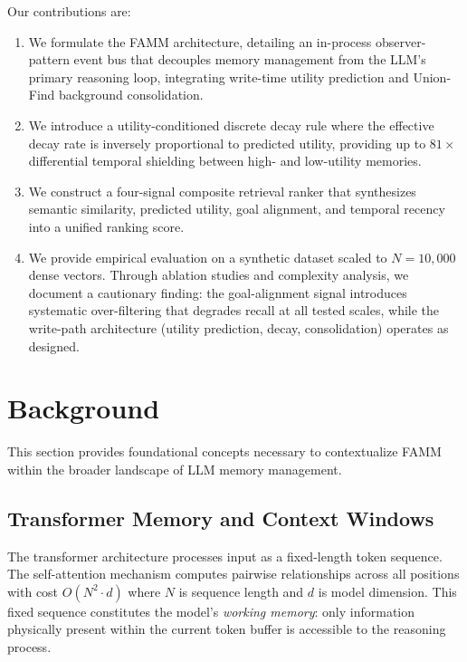\documentclass[conference]{IEEEtran}
\begin{document}
Our contributions are:
\begin{enumerate}
    \item We formulate the FAMM architecture, detailing an in-process observer-pattern event bus that decouples memory management from the LLM's primary reasoning loop, integrating write-time utility prediction and Union-Find background consolidation.
    \item We introduce a utility-conditioned discrete decay rule where the effective decay rate is inversely proportional to predicted utility, providing up to $81\times$ differential temporal shielding between high- and low-utility memories.
    \item We construct a four-signal composite retrieval ranker that synthesizes semantic similarity, predicted utility, goal alignment, and temporal recency into a unified ranking score.
    \item We provide empirical evaluation on a synthetic dataset scaled to $N{=}10{,}000$ dense vectors. Through ablation studies and complexity analysis, we document a cautionary finding: the goal-alignment signal introduces systematic over-filtering that degrades recall at all tested scales, while the write-path architecture (utility prediction, decay, consolidation) operates as designed.
\end{enumerate}

\section{Background}
\label{sec:background}

This section provides foundational concepts necessary to contextualize FAMM within the broader landscape of LLM memory management.

\subsection{Transformer Memory and Context Windows}
The transformer architecture \cite{vaswani2017attention} processes input as a fixed-length token sequence. The self-attention mechanism computes pairwise relationships across all positions with cost $O(N^2 \cdot d)$ where $N$ is sequence length and $d$ is model dimension. This fixed sequence constitutes the model's \textit{working memory}: only information physically present within the current token buffer is accessible to the reasoning process.
\end{document}
